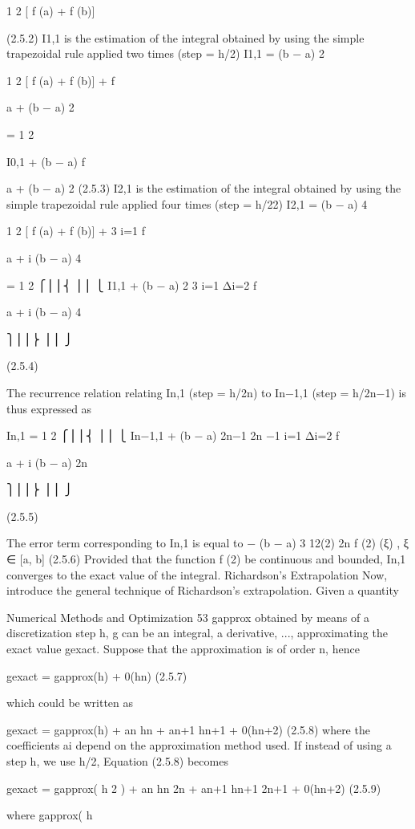 \documentclass[letterpaper,12pt]{article}
\begin{document}
1
2 [ f (a) + f (b)]


(2.5.2)
I1,1 is the estimation of the integral obtained by using the simple trapezoidal rule
applied two times (step = h/2)
I1,1 = (b − a)
2

1
2 [ f (a) + f (b)] + f

a + (b − a)
2


= 1
2

I0,1 + (b − a) f

a + (b − a)
2
 (2.5.3)
I2,1 is the estimation of the integral obtained by using the simple trapezoidal rule
applied four times (step = h/22)
I2,1 = (b − a)
4

1
2 [ f (a) + f (b)] +
3
i=1
f

a + i
(b − a)
4


= 1
2
⎧⎪⎪⎨
⎪⎪
⎩
I1,1 + (b − a)
2
3
i=1
Δi=2
f

a + i
(b − a)
4

⎫⎪⎪⎬
⎪⎪
⎭

(2.5.4)

The recurrence relation relating In,1 (step = h/2n) to In−1,1 (step = h/2n−1) is thus
expressed as

In,1 = 1
2
⎧⎪⎪⎨
⎪⎪
⎩
In−1,1 + (b − a)
2n−1
2n
−1
i=1
Δi=2
f

a + i
(b − a)
2n

⎫⎪⎪⎬
⎪⎪
⎭

(2.5.5)

The error term corresponding to In,1 is equal to
− (b − a)
3
12(2)
2n f (2)
(ξ) , ξ ∈ [a, b] (2.5.6)
Provided that the function f (2) be continuous and bounded, In,1 converges to the exact
value of the integral.
Richardson’s Extrapolation
Now, introduce the general technique of Richardson’s extrapolation. Given a quantity

Numerical Methods and Optimization 53
gapprox obtained by means of a discretization step h, g can be an integral, a derivative,
..., approximating the exact value gexact. Suppose that the approximation is of order
n, hence

gexact = gapprox(h) + 0(hn) (2.5.7)

which could be written as

gexact = gapprox(h) + an hn + an+1 hn+1 + 0(hn+2) (2.5.8)
where the coefficients ai depend on the approximation method used. If instead of using
a step h, we use h/2, Equation (2.5.8) becomes

gexact = gapprox(
h
2
) + an
hn
2n + an+1
hn+1
2n+1 + 0(hn+2) (2.5.9)

where gapprox( h
\end{document}
